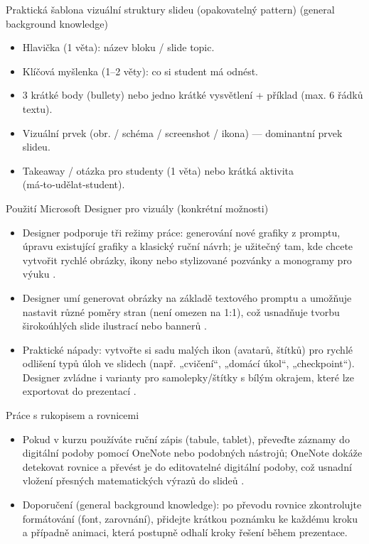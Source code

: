 \documentclass{report}%
\begin{document}
Praktická šablona vizuální struktury slideu (opakovatelný pattern)  (general background knowledge)
\begin{itemize}
  \item Hlavička (1 věta): název bloku / slide topic.
  \item Klíčová myšlenka (1--2 věty): co si student má odnést.
  \item 3 krátké body (bullety) nebo jedno krátké vysvětlení + příklad (max. 6 řádků textu).
  \item Vizuální prvek (obr. / schéma / screenshot / ikona) — dominantní prvek slideu.
  \item Takeaway / otázka pro studenty (1 věta) nebo krátká aktivita (má‑to‑udělat‑student).
\end{itemize}

Použití Microsoft Designer pro vizuály (konkrétní možnosti)
\begin{itemize}
  \item Designer podporuje tři režimy práce: generování nové grafiky z promptu, úpravu existující grafiky a klasický ruční návrh; je užitečný tam, kde chcete vytvořit rychlé obrázky, ikony nebo stylizované pozvánky a monogramy pro výuku \cite{kb_ai_101_tipu_pdf_04e4a115_page_51_1}.
  \item Designer umí generovat obrázky na základě textového promptu a umožňuje nastavit různé poměry stran (není omezen na 1:1), což usnadňuje tvorbu širokoúhlých slide ilustrací nebo bannerů \cite{kb_ai_101_tipu_pdf_04e4a115_page_51_1}.
  \item Praktické nápady: vytvořte si sadu malých ikon (avatarů, štítků) pro rychlé odlišení typů úloh ve slidech (např. „cvičení“, „domácí úkol“, „checkpoint“). Designer zvládne i varianty pro samolepky/štítky s bílým okrajem, které lze exportovat do prezentací \cite{kb_ai_101_tipu_pdf_04e4a115_page_51_1}.
\end{itemize}

Práce s rukopisem a rovnicemi
\begin{itemize}
  \item Pokud v kurzu používáte ruční zápis (tabule, tablet), převeďte záznamy do digitální podoby pomocí OneNote nebo podobných nástrojů; OneNote dokáže detekovat rovnice a převést je do editovatelné digitální podoby, což usnadní vložení přesných matematických výrazů do slideů \cite{kb_ai_101_tipu_pdf_04e4a115_page_8_1}.
  \item Doporučení (general background knowledge): po převodu rovnice zkontrolujte formátování (font, zarovnání), přidejte krátkou poznámku ke každému kroku a případně animaci, která postupně odhalí kroky řešení během prezentace.
\end{itemize}
\end{document}
